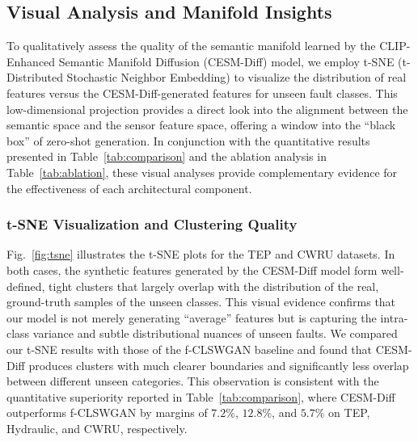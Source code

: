 \subsection{Visual Analysis and Manifold Insights}
\label{sec:visualization}

To qualitatively assess the quality of the semantic manifold learned by the CLIP-Enhanced Semantic Manifold Diffusion (CESM-Diff) model, we employ t-SNE (t-Distributed Stochastic Neighbor Embedding) to visualize the distribution of real features versus the CESM-Diff-generated features for unseen fault classes. This low-dimensional projection provides a direct look into the alignment between the semantic space and the sensor feature space, offering a window into the ``black box'' of zero-shot generation. In conjunction with the quantitative results presented in Table~\ref{tab:comparison} and the ablation analysis in Table~\ref{tab:ablation}, these visual analyses provide complementary evidence for the effectiveness of each architectural component.

\subsubsection{t-SNE Visualization and Clustering Quality}
Fig.~\ref{fig:tsne} illustrates the t-SNE plots for the TEP and CWRU datasets. In both cases, the synthetic features generated by the CESM-Diff model form well-defined, tight clusters that largely overlap with the distribution of the real, ground-truth samples of the unseen classes. This visual evidence confirms that our model is not merely generating ``average'' features but is capturing the intra-class variance and subtle distributional nuances of unseen faults. We compared our t-SNE results with those of the f-CLSWGAN baseline and found that CESM-Diff produces clusters with much clearer boundaries and significantly less overlap between different unseen categories. This observation is consistent with the quantitative superiority reported in Table~\ref{tab:comparison}, where CESM-Diff outperforms f-CLSWGAN by margins of $7.2\%$, $12.8\%$, and $5.7\%$ on TEP, Hydraulic, and CWRU, respectively.

